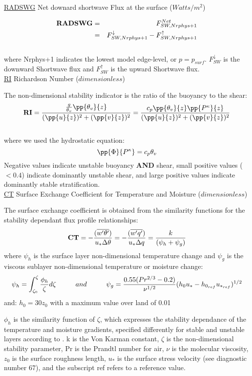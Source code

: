 { \underline {RADSWG} Net downard shortwave Flux at the surface ($Watts/m^2$)}

\begin{eqnarray*}
{\bf RADSWG} & =  & F_{SW,Nrphys+1}^{Net} \\
             & =  & F_{SW,Nrphys+1}^\downarrow - F_{SW,Nrphys+1}^\uparrow
\end{eqnarray*}
\\
where Nrphys+1 indicates the lowest model edge-level, or $p = p_{surf}$.
$F_{SW}^\downarrow$ is
the downward Shortwave flux and $F_{SW}^\uparrow$ is the upward Shortwave flux.
\\


\noindent
{ \underline {RI} Richardson Number} ($dimensionless$)

\noindent
The non-dimensional stability indicator is the ratio of the buoyancy to the shear:
\[
{\bf RI} = { { {g \over \theta_v} \pp {\theta_v}{z} } \over { (\pp{u}{z})^2 + (\pp{v}{z})^2 } }
 =  {  {c_p \pp{\theta_v}{z} \pp{P^ \kappa}{z} } \over { (\pp{u}{z})^2 + (\pp{v}{z})^2 } }
\]
\\
where we used the hydrostatic equation: 
\[
{\pp{\Phi}{P^ \kappa}} = c_p \theta_v
\]
Negative values indicate unstable buoyancy {\bf{AND}} shear, small positive values ($<0.4$)
indicate dominantly unstable shear, and large positive values indicate dominantly stable
stratification.
\\

\noindent
{ \underline {CT}  Surface Exchange Coefficient for Temperature and Moisture ($dimensionless$) }

\noindent
The surface exchange coefficient is obtained from the similarity functions for the stability
 dependant flux profile relationships:
\[
{\bf CT} = -{( {\overline{w^{\prime}\theta^{\prime}}}) \over {u_* \Delta \theta }} = 
-{( {\overline{w^{\prime}q^{\prime}}}) \over {u_* \Delta q }} = 
{ k \over { (\psi_{h} + \psi_{g}) } } 
\]
where $\psi_h$ is the surface layer non-dimensional temperature change and $\psi_g$ is the
viscous sublayer non-dimensional temperature or moisture change:
\[
\psi_{h} = {\int_{\zeta_{0}}^{\zeta} {\phi_{h} \over \zeta} d \zeta} \hspace{1cm} and 
\hspace{1cm} \psi_{g} = { 0.55 (Pr^{2/3} - 0.2) \over \nu^{1/2} } 
(h_{0}u_{*} - h_{0_{ref}}u_{*_{ref}})^{1/2}
\]
and:
$h_{0} = 30z_{0}$ with a maximum value over land of 0.01

\noindent
$\phi_h$ is the similarity function of $\zeta$, which expresses the stability dependance of
the temperature and moisture gradients, specified differently for stable and unstable 
layers according to \cite{helfschu:95}. k is the Von Karman constant, $\zeta$ is the 
non-dimensional stability parameter, Pr is the Prandtl number for air, $\nu$ is the molecular 
viscosity, $z_{0}$ is the surface roughness length, $u_*$ is the surface stress velocity 
(see diagnostic number 67), and the subscript ref refers to a reference value.
\\

